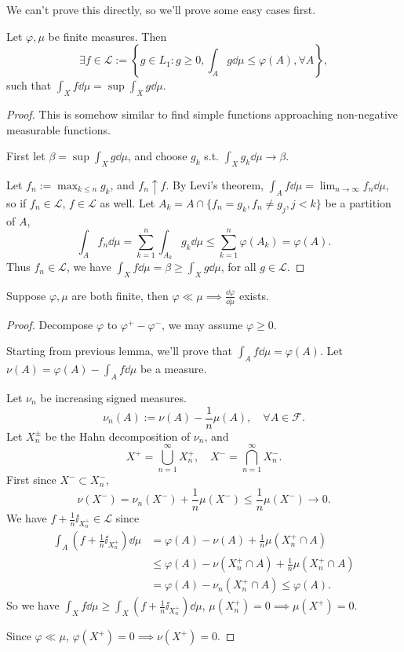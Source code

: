 We can't prove this directly, so we'll prove some easy cases first.
\begin{lemma}
	Let $\varphi, \mu$ be finite measures. Then
	\[
	\exists f\in \mathscr{L}:= \left\{g\in L_1: g\ge 0,
	\int_A g\dd\mu\le \varphi(A), \forall A\right\},
	\]
	such that $\int_X f\dd\mu = \sup \int_X g\dd \mu$.
\end{lemma}
\begin{proof}[Proof]
    This is somehow similar to find simple functions
	approaching non-negative measurable functions.

	First let $\beta = \sup\int_X g\dd \mu$, and choose $g_k$ s.t.
	$\int_X g_k\dd \mu \to \beta$.

	Let $f_n := \max_{k\le n}g_k$, and $f_n \uparrow f$.
	By Levi's theorem, $\int_A f\dd\mu = \lim_{n\to \infty}f_n\dd \mu$,
	so if $f_n\in \mathscr{L}$, $f\in \mathscr{L}$ as well.
	Let $A_k = A\cap \{f_n = g_k, f_n\ne g_j, j< k\}$ be a partition of $A$,
	\[
	\int_A f_n\dd\mu = \sum_{k=1}^{n} \int_{A_k} g_k\dd\mu
	\le \sum_{k=1}^{n} \varphi(A_k) = \varphi(A).
	\]
	Thus $f_n\in \mathscr{L}$, we have $\int_X f \dd\mu = \beta\ge \int_Xg\dd\mu$,
	for all $g\in \mathscr{L}$.
\end{proof}
\begin{proposition}
	Suppose $\varphi, \mu$ are both finite, then $\varphi\ll \mu\implies
	\frac{\dd\varphi}{\dd \mu}$ exists.
\end{proposition}
\begin{proof}[Proof]
	Decompose $\varphi$ to $\varphi^+ - \varphi^-$, we may assume $\varphi\ge 0$.

    Starting from previous lemma, we'll prove that $\int_A f\dd\mu = \varphi(A)$.
	Let $\nu(A) = \varphi(A) - \int_A f\dd \mu$ be a measure.

	Let $\nu_n$ be increasing signed measures.
	\[
		\nu_n(A):= \nu(A) - \frac{1}{n}\mu(A), \quad \forall A\in \mathscr{F}.
	\]
	Let $X_n^\pm$ be the Hahn decomposition of $\nu_n$, and
	\[
	X^+ = \bigcup_{n=1}^\infty X_n^+,\quad
	X^- = \bigcap_{n=1}^\infty X_n^-.
	\]
	First since $X^- \subset X_n^-$,
	\[
		\nu(X^-) = \nu_n(X^-) + \frac{1}{n}\mu(X^-)\le \frac{1}{n}\mu(X^-)\to 0.
	\]
	We have $f + \frac{1}{n}\ii_{X_n^+}\in \mathscr{L}$ since
	\begin{align*}
		\int_A\left(f+\frac{1}{n}\ii_{X_n^+}\right)\dd\mu
		&= \varphi(A) - \nu(A) + \frac{1}{n}\mu(X_n^+ \cap A)\\
		&\le \varphi(A) - \nu(X_n^+\cap A) + \frac{1}{n}\mu(X_n^+\cap A)\\
		&=\varphi(A) - \nu_n(X_n^+\cap A) \le \varphi(A).
	\end{align*}
	So we have $\int_X f\dd\mu \ge \int_X (f+\frac{1}{n}\ii_{X_n^+})\dd\mu$,
	$\mu(X_n^+) = 0 \implies \mu(X^+) = 0$.

	Since $\varphi\ll \mu$,  $\varphi(X^+) = 0\implies \nu(X^+) = 0$.
\end{proof}

